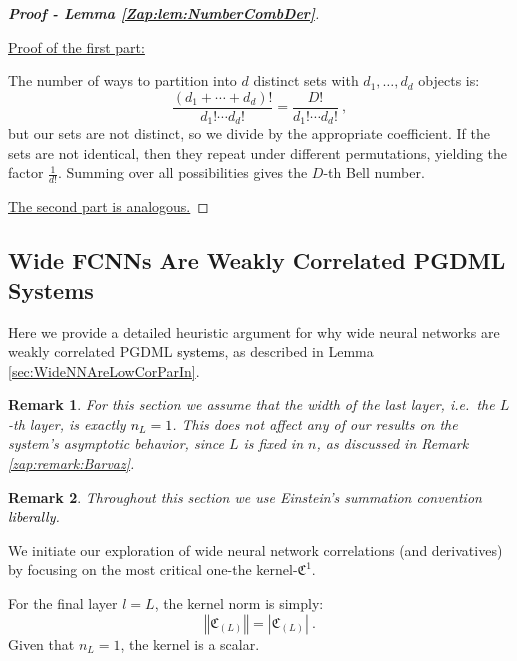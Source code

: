 \documentclass{article} %
\newtheorem{remark}{Remark}
[section]
\begin{document}
\begin{proof}[\textbf{Proof - Lemma \ref{Zap:lem:NumberCombDer}}]
\

\underline{Proof of the first part:}

The number of ways to partition into \(d\) distinct sets with \(d_1,\ldots,d_d\) objects is:
\begin{equation}
\frac{\left(d_{1}+\cdots + d_{d}\right)!}{d_{1}!\cdots d_{d}!}=\frac{D!}{d_{1}!\cdots d_{d}!} \ ,
\end{equation}
but our sets are not distinct, so we divide by the appropriate coefficient. If the sets are not identical, then they repeat under different permutations, yielding the factor \(\frac{1}{d!}\). Summing over all possibilities gives the \(D\)-th Bell number.

\underline{The second part is analogous.}
\end{proof}

\subsection{Wide FCNNs Are Weakly Correlated PGDML Systems}
\label{zap:sec:NNPGDML}

Here we provide a detailed heuristic argument for why wide neural networks are weakly correlated PGDML \textcolor{black}{systems}, as described in Lemma \ref{sec:WideNNAreLowCorParIn}.

\begin{remark}
\textup
{For this section we assume that the width of the last layer, i.e.\ the \(L\)-th layer, is exactly \textcolor{black}{\(n_L=1\)}. This does not affect any of our results on the system's asymptotic behavior, since \(L\) is fixed in \(n\), as discussed in Remark \ref{zap:remark:Barvaz}.}
\end{remark}

\begin{remark}
\textup
{Throughout this section we use Einstein's summation convention \textcolor{black}{liberally}.}
\end{remark}

We initiate our exploration of wide neural network correlations (and derivatives) by focusing on the most critical one-the kernel-\(\mathfrak{C}^{1}\).

For the final layer \(l=L\), the kernel norm is simply:
\begin{equation}
\left\Vert \mathfrak{C}_{\left(L\right)}\right\Vert =\left|\mathfrak{C}_{\left(L\right)}\right| \ .
\end{equation}
Given that \(n_L=1\), the kernel is a scalar.
\end{document}
